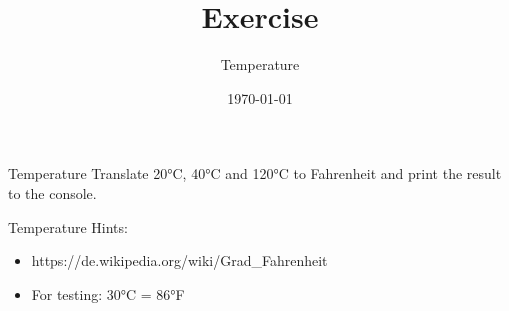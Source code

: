 


\title{Exercise}
\subtitle{Temperature}
\date{\today}




\begin{frame}
    \titlepage
\end{frame}

\begin{frame}{Temperature}
    Translate 20°C, 40°C and 120°C to Fahrenheit and print the result to the console.
\end{frame}

\begin{frame}{Temperature}
    Hints:
    \begin{itemize}
        \item https://de.wikipedia.org/wiki/Grad_Fahrenheit
        \item For testing: 30°C = 86°F
    \end{itemize}
\end{frame}



